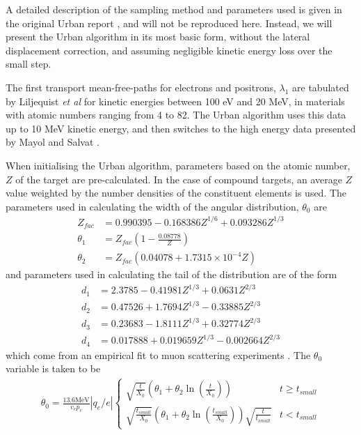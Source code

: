 \documentclass[12pt]{article}
\numberwithin{equation}{section}
\begin{document}
A detailed description of the sampling method and parameters used is given in the original Urban report \cite{code:geant4:Urban}, and will not be reproduced here. Instead, we will present the Urban algorithm in its most basic form, without the lateral displacement correction, and assuming negligible kinetic energy loss over the small step.

The first transport mean-free-paths for electrons and positrons, $\lambda_1$ are tabulated by Liljequist \textit{et al} \cite{code:geant4:urban:meanFreePath} for kinetic energies between 100 eV and 20 MeV, in materials with atomic numbers ranging from 4 to 82. The Urban algorithm uses this data up to 10 MeV kinetic energy, and then switches to the high energy data presented by Mayol and Salvat \cite{code:geant4:urban:meanFreePathHigh}.

When initialising the Urban algorithm, parameters based on the atomic number, $Z$ of the target are pre-calculated. In the case of compound targets, an average $Z$ value weighted by the number densities of the constituent elements is used. The parameters used in calculating the width of the angular distribution, $\theta_0$ are
%
\begin{align}
  Z_{fac} &= 0.990395 - 0.168386Z^{1/6} + 0.093286Z^{1/3} \\
  \theta_1 &= Z_{fac}\left(1-\frac{0.08778}{Z}\right) \\
  \theta_2 &= Z_{fac}(0.04078 + 1.7315\times10^{-4}Z)
\end{align}
%
and parameters used in calculating the tail of the distribution are of the form
%
\begin{align}
 d_1 &= 2.3785 - 0.41981 Z^{1/3} + 0.0631 Z^{2/3} \\
 d_2 &= 0.47526 + 1.7694 Z^{1/3} - 0.33885 Z^{2/3} \\
 d_3 &= 0.23683 - 1.8111 Z^{1/3} + 0.32774 Z^{2/3} \\
 d_4 &= 0.017888 + 0.019659 Z^{1/3} - 0.002664 Z^{2/3}
\end{align}
%
which come from an empirical fit to muon scattering experiments \cite{code:geant4:urban:dFit}. The $\theta_0$ variable is taken to be
%
\begin{align}
  \theta_0 = \frac{13.6 \text{MeV}}{v_ep_e}|q_e/e|
  \begin{cases}
    \sqrt{\frac{t}{X_0}}\left(\theta_1 + \theta_2 \ln\left(\frac{t}{X_0}\right)\right) & t \geq t_{small}  \\
    \sqrt{\frac{t_{small}}{X_0}}\left(\theta_1 + \theta_2 \ln\left(\frac{t_{small}}{X_0}\right)\right)\sqrt{\frac{t}{t_{small}}} & t < t_{small}
  \end {cases}
\end{align}
\end{document}
